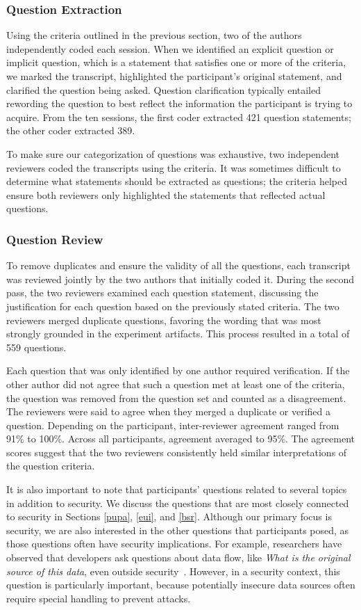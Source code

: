 \documentclass{acm_proc_article-sp}
\begin{document}
\subsubsection{Question Extraction}
Using the criteria outlined in the previous section, two of the authors independently coded each session. 
When we identified an explicit question or implicit question, which is a statement that satisfies one or more of the criteria, we marked the transcript, highlighted the participant's original statement, and clarified the question being asked.
Question clarification typically entailed rewording the question to best reflect the information the participant is trying to acquire.
From the ten sessions, the first coder extracted 421 question statements; the other coder extracted 389. 

To make sure our categorization of questions was exhaustive, two independent reviewers coded the transcripts using the criteria.
It was sometimes difficult to determine what statements should be extracted as questions; the criteria helped ensure both reviewers only highlighted the statements that reflected actual questions. 


\subsubsection{Question Review}
To remove duplicates and ensure the validity of all the questions, each transcript was reviewed jointly by the two authors that initially coded it.
During the second pass, the two reviewers examined each question statement, discussing the justification for each question based on the previously stated criteria.
The two reviewers merged duplicate questions, favoring the wording that was most strongly grounded in the experiment artifacts.
This process resulted in a total of 559 questions.

Each question that was only identified by one author required verification.
If the other author did not agree that such a question met at least one of the criteria, the question was removed from the question set and counted as a disagreement.
The reviewers were said to agree when they merged a duplicate or verified a question. Depending on the participant, inter-reviewer agreement ranged from 91\% to 100\%. Across all participants, agreement averaged to 95\%.
The agreement scores suggest that the two reviewers consistently held similar interpretations of the question criteria.

It is also important to note that participants' questions related to several topics in addition to security. 
We discuss the questions that are most closely connected to security in Sections \ref{pupa}, \ref{eui}, and \ref{bsr}.
Although our primary focus is security, we are also interested in the other questions that participants posed, as those questions often have security implications.
For example, researchers have observed that developers ask questions about data flow, like \emph{What is the original source of this data}, even outside security~\cite{latoza2010hard}.
However, in a security context, this question is particularly important, because potentially insecure data sources often require special handling to prevent attacks.
\end{document}
